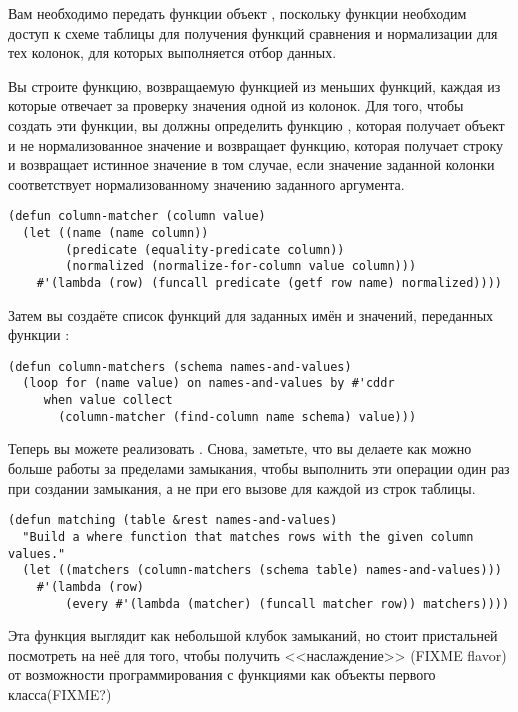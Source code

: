 Вам необходимо передать функции  объект , поскольку функции
необходим доступ к схеме таблицы для получения функций сравнения и нормализации для тех
колонок, для которых выполняется отбор данных.

Вы строите функцию, возвращаемую функцией  из меньших функций, каждая из
которые отвечает за проверку значения одной из колонок.  Для того, чтобы создать эти
функции, вы должны определить функцию , которая получает объект
 и не нормализованное значение и возвращает функцию, которая получает строку
и возвращает истинное значение в том случае, если значение заданной колонки соответствует
нормализованному значению заданного аргумента.

\begin{lstlisting}
(defun column-matcher (column value)
  (let ((name (name column))
        (predicate (equality-predicate column))
        (normalized (normalize-for-column value column)))
    #'(lambda (row) (funcall predicate (getf row name) normalized))))
\end{lstlisting}

Затем вы создаёте список функций  для заданных имён и значений,
переданных функции :

\begin{lstlisting}
(defun column-matchers (schema names-and-values)
  (loop for (name value) on names-and-values by #'cddr
     when value collect
       (column-matcher (find-column name schema) value)))
\end{lstlisting}

Теперь вы можете реализовать .  Снова, заметьте, что вы делаете как можно
больше работы за пределами замыкания, чтобы выполнить эти операции один раз при создании
замыкания, а не при его вызове для каждой из строк таблицы.

\begin{lstlisting}
(defun matching (table &rest names-and-values)
  "Build a where function that matches rows with the given column values."
  (let ((matchers (column-matchers (schema table) names-and-values)))
    #'(lambda (row)
        (every #'(lambda (matcher) (funcall matcher row)) matchers))))
\end{lstlisting}

Эта функция выглядит как небольшой клубок замыканий, но стоит пристальней посмотреть на
неё для того, чтобы получить <<наслаждение>> (FIXME flavor) от возможности программирования
с функциями как объекты первого класса(FIXME?)


